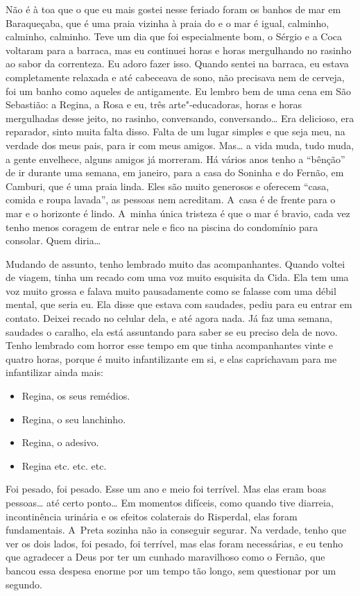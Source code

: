 Não é à toa que o que eu mais gostei nesse feriado foram os banhos de
mar em Baraqueçaba, que é uma praia vizinha à praia do  e o mar é
igual, calminho, calminho, calminho. Teve um dia que foi especialmente
bom, o Sérgio e a Coca voltaram para a barraca, mas eu continuei horas e
horas mergulhando no rasinho ao sabor da correnteza. Eu adoro fazer
isso. Quando sentei na barraca, eu estava completamente relaxada e até
cabeceava de sono, não precisava nem de cerveja, foi um banho como
aqueles de antigamente. Eu lembro bem de uma cena em São Sebastião: a
Regina, a Rosa e eu, três arte"-educadoras, horas e horas mergulhadas
desse jeito, no rasinho, conversando, conversando… Era delicioso,
era reparador, sinto muita falta disso. Falta de um lugar simples e que
seja meu, na verdade dos meus pais, para ir com meus amigos. Mas…
a vida muda, tudo muda, a gente envelhece, alguns amigos já morreram. Há
vários anos tenho a ``bênção'' de ir durante uma semana, em janeiro,
para a casa do Soninha e do Fernão, em Camburi, que é uma praia linda.
Eles são muito generosos e oferecem ``casa, comida e roupa lavada'', as
pessoas nem acreditam. A~casa é de frente para o mar e o horizonte é
lindo. A~minha única tristeza é que o mar é bravio, cada vez tenho menos
coragem de entrar nele e fico na piscina do condomínio para consolar.
Quem diria…

Mudando de assunto, tenho lembrado muito das acompanhantes. Quando
voltei de viagem, tinha um recado com uma voz muito esquisita da Cida.
Ela tem uma voz muito grossa e falava muito pausadamente como se falasse
com uma débil mental, que seria eu. Ela disse que estava com saudades,
pediu para eu entrar em contato. Deixei recado no celular dela, e até
agora nada. Já faz uma semana, saudades o caralho, ela está assuntando
para saber se eu preciso dela de novo. Tenho lembrado com horror esse
tempo em que tinha acompanhantes vinte e quatro horas, porque é muito
infantilizante em si, e elas caprichavam para me infantilizar ainda
mais:

\begin{itemize}
\item
  Regina, os seus remédios.
\item
  Regina, o seu lanchinho.
\item
  Regina, o adesivo.
\item
  Regina etc. etc. etc.
\end{itemize}
Foi pesado, foi pesado. Esse um ano e meio foi terrível. Mas elas eram
boas pessoas… até certo ponto… Em momentos difíceis, como
quando tive diarreia, incontinência urinária e os efeitos colaterais do
Risperdal, elas foram fundamentais. A~Preta sozinha não ia conseguir
segurar. Na verdade, tenho que ver os dois lados, foi pesado, foi
terrível, mas elas foram necessárias, e eu tenho que agradecer a Deus
por ter um cunhado maravilhoso como o Fernão, que bancou essa despesa
enorme por um tempo tão longo, sem questionar por um segundo.

